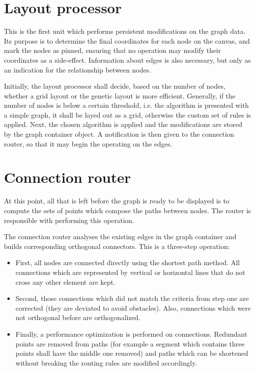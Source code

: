 \section{Layout processor}

This is the first unit which performs persistent modifications on the graph data. Its purpose is to determine 
the final coordinates for each node on the canvas, and mark the nodes as pinned, ensuring that no operation may 
modify their coordinates as a side-effect. Information about edges is also necessary, but only as an indication 
for the relationship between nodes.

Initially, the layout processor shall decide, based on the number of nodes, whether a grid layout or the genetic 
layout is more efficient. Generally, if the number of nodes is below a certain threshold, i.e. the algorithm is 
presented with a simple graph, it shall be layed out as a grid, otherwise the custom set of rules is applied. 
Next, the chosen algorithm is applied and the modifications are stored by the graph container object. A notification 
is then given to the connection router, so that it may begin the operating on the edges.

\section{Connection router}

At this point, all that is left before the graph is ready to be displayed is to compute the sets of points which compose 
the paths between nodes. The router is responsible with performing this operation.

The connection router analyses the existing edges in the graph container and builds corresponding orthogonal connectors.
This is a three-step operation:

\begin{itemize}

\item First, all nodes are connected directly using the shortest path method. All connections which are represented by 
vertical or horizontal lines that do not cross any other element are kept.

\item Second, those connections which did not match the criteria from step one are corrected (they are deviated to avoid 
obstacles). Also, connections which were not orthogonal before are orthogonalized.

\item Finally, a performance optimization is performed on connections. Redundant points are removed from paths (for example 
a segment which contains three points shall have the middle one removed) and paths which can be shortened without breaking 
the routing rules are modified accordingly.

\end{itemize}

